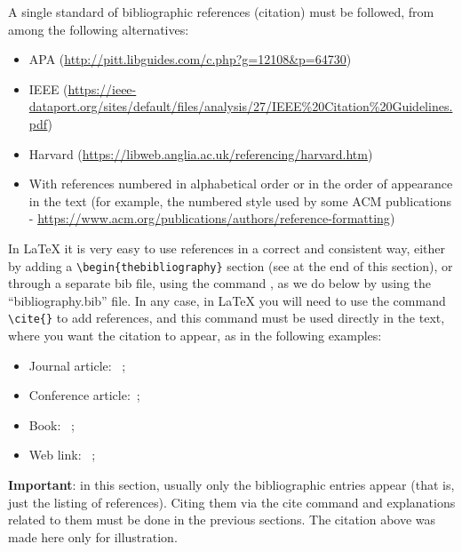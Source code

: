 \documentclass[12pt,a4paper]{report}
\begin{document}
A single standard of bibliographic references (citation) must be followed, from among the following alternatives:
\begin{itemize}
	\item APA (\url{http://pitt.libguides.com/c.php?g=12108\&p=64730})
	\item IEEE (\url{https://ieee-dataport.org/sites/default/files/analysis/27/IEEE\%20Citation\%20Guidelines.pdf})
	\item Harvard (\url{https://libweb.anglia.ac.uk/referencing/harvard.htm})
	\item With references numbered in alphabetical order or in the order of appearance in the text (for example, the numbered style used by some ACM publications - \url{https://www.acm.org/publications/authors/reference-formatting})
\end{itemize}

In LaTeX it is very easy to use references in a correct and consistent way, either by adding a
\verb!\begin{thebibliography}!
section (see at the end of this section), or through a separate bib file, using the command
\verb!!,
as we do below by using the ``bibliography.bib'' file. In any case, in LaTeX you will need to use the command
\verb!\cite{}!
to add references, and this command must be used directly in the text, where you want the citation to appear, as in the following examples:
\begin{itemize}
	\item Journal article: ~\cite{article};
	\item Conference article:~\cite{proc};
	\item Book: ~\cite{book};
	\item Web link: ~\cite{silva};
\end{itemize}

\textbf{Important}: in this section, usually only the bibliographic entries appear (that is, just the listing of references). Citing them via the cite command and explanations related to them must be done in the previous sections. The citation above was made here only for illustration.




\end{document}
